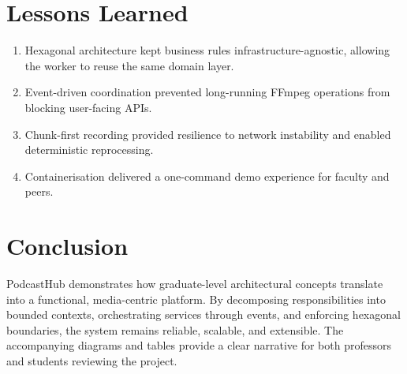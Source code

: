 \documentclass[12pt]{article}
\begin{document}
\section{Lessons Learned}

\begin{enumerate}[leftmargin=*]
    \item Hexagonal architecture kept business rules infrastructure-agnostic, allowing the worker to reuse the same domain layer.
    \item Event-driven coordination prevented long-running FFmpeg operations from blocking user-facing APIs.
    \item Chunk-first recording provided resilience to network instability and enabled deterministic reprocessing.
    \item Containerisation delivered a one-command demo experience for faculty and peers.
\end{enumerate}

\section{Conclusion}

PodcastHub demonstrates how graduate-level architectural concepts translate into a functional, media-centric platform. By decomposing responsibilities into bounded contexts, orchestrating services through events, and enforcing hexagonal boundaries, the system remains reliable, scalable, and extensible. The accompanying diagrams and tables provide a clear narrative for both professors and students reviewing the project.
\end{document}
